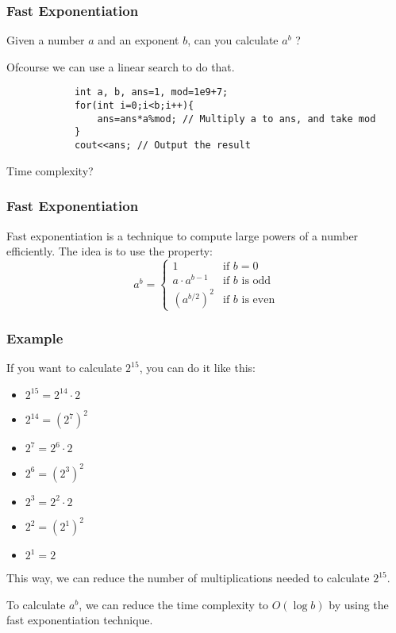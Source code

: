 \documentclass[xcolor=dvipsnames]{beamer}
\begin{document}
    \begin{frame}[fragile]
        \frametitle{Fast Exponentiation}
        Given a number $a$ and an exponent $b$,
        can you calculate $a^b$ ?

        Ofcourse we can use a linear search to do that.
        \begin{verbatim}
            int a, b, ans=1, mod=1e9+7;
            for(int i=0;i<b;i++){
                ans=ans*a%mod; // Multiply a to ans, and take mod
            }
            cout<<ans; // Output the result
        \end{verbatim}
        Time complexity?
    \end{frame}
    
    \begin{frame}
        \frametitle{Fast Exponentiation}
        Fast exponentiation is a technique to compute large powers of a number efficiently.
        The idea is to use the property:
        \[
            a^b = \begin{cases}
                1 & \text{if } b = 0 \\
                a \cdot a^{b-1} & \text{if } b \text{ is odd} \\
                (a^{b/2})^2 & \text{if } b \text{ is even}
            \end{cases}
        \]
    \end{frame}

    \begin{frame}
        \frametitle{Example}
        If you want to calculate $2^{15}$, you can do it like this:
        \begin{itemize}
            \item $2^{15} = 2^{14} \cdot 2$
            \item $2^{14} = (2^7)^2$
            \item $2^7 = 2^6 \cdot 2$
            \item $2^6 = (2^3)^2$
            \item $2^3 = 2^2 \cdot 2$
            \item $2^2 = (2^1)^2$
            \item $2^1 = 2$
        \end{itemize}
        This way, we can reduce the number of multiplications needed to calculate $2^{15}$.

        To calculate $a^b$, we can reduce the time complexity to $O(\log b)$
        by using the fast exponentiation technique.
   \end{frame}
\end{document}
